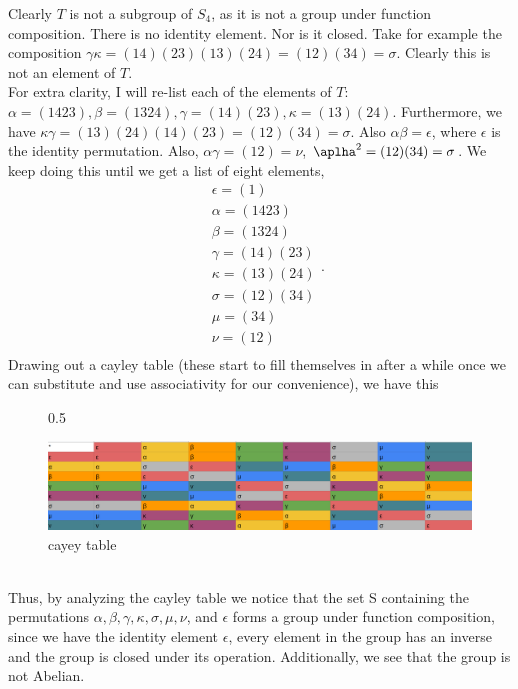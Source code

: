 \documentclass{article}
\begin{document}
Clearly $T$ is not a subgroup of $S_4$, as it is not a group under function composition. There is no identity element. Nor is it closed. Take for example the composition $\gamma\kappa = (14)(23)(13)(24) = (12)(34) = \sigma$. Clearly this is not an element of $T$. \\


 For extra clarity, I will re-list each of the elements of $T$: $\alpha = (1423), \beta = (1324), \gamma = (14)(23), \kappa = (13)(24)$. Furthermore, we have $\kappa\gamma = (13)(24)(14)(23) = (12)(34) = \sigma$. Also $\alpha\beta = \epsilon$, where $\epsilon$ is the identity permutation. Also, $\alpha\gamma = (12) = \nu$, $\aplha^2 = (12)(34) = \sigma$. We keep doing this until we get a list of eight elements,
$$\begin{array}{cc}
     &  \epsilon = (1)\\
&\alpha = (1423)\\
&\beta = (1324)\\
&\gamma = (14)(23)\\
&\kappa = (13)(24)\\
&\sigma = (12)(34)\\
&\mu = (34)\\
&\nu= (12)\\
\end{array}.$$
Drawing out a cayley table (these start to fill themselves in after a while once we can substitute and use associativity for our convenience), we have this \\

\begin{figure}{0.5\textwidth}

    \includegraphics[width=1\textwidth]{cayley table.png}
  \caption{cayey table}
\end{figure}
\\

Thus, by analyzing the cayley table we notice that the set S containing the permutations $\alpha, \beta, \gamma, \kappa, \sigma, \mu, \nu$, and $\epsilon$ forms a group under function composition, since we have the identity element $\epsilon$, every element in the group has an inverse and the group is closed under its operation. Additionally, we see that the group is not Abelian. \\
\end{document}
